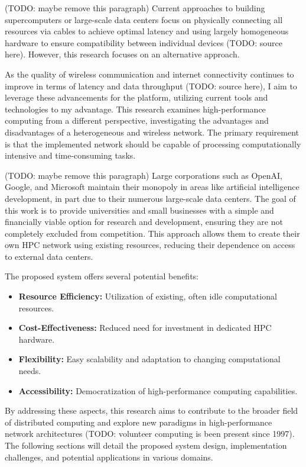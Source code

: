 (TODO: maybe remove this paragraph) Current approaches to building supercomputers or large-scale data centers focus on physically connecting all resources via cables to achieve optimal latency and using largely homogeneous hardware to ensure compatibility between individual devices (TODO: source here). However, this research focuses on an alternative approach.

As the quality of wireless communication and internet connectivity continues to improve in terms of latency and data throughput (TODO: source here), I aim to leverage these advancements for the platform, utilizing current tools and technologies to my advantage. This research examines high-performance computing from a different perspective, investigating the advantages and disadvantages of a heterogeneous and wireless network. The primary requirement is that the implemented network should be capable of processing computationally intensive and time-consuming tasks.

(TODO: maybe remove this paragraph) Large corporations such as OpenAI, Google, and Microsoft maintain their monopoly in areas like artificial intelligence development, in part due to their numerous large-scale data centers. The goal of this work is to provide universities and small businesses with a simple and financially viable option for research and development, ensuring they are not completely excluded from competition. This approach allows them to create their own \ac{HPC} network using existing resources, reducing their dependence on access to external data centers.

The proposed system offers several potential benefits:

\begin{itemize}
    \item \textbf{Resource Efficiency:} Utilization of existing, often idle computational resources.
    \item \textbf{Cost-Effectiveness:} Reduced need for investment in dedicated HPC hardware.
    \item \textbf{Flexibility:} Easy scalability and adaptation to changing computational needs.
    \item \textbf{Accessibility:} Democratization of high-performance computing capabilities.
\end{itemize}

By addressing these aspects, this research aims to contribute to the broader field of distributed computing and explore new paradigms in high-performance network architectures (TODO: volunteer computing is been present since 1997). The following sections will detail the proposed system design, implementation challenges, and potential applications in various domains.

